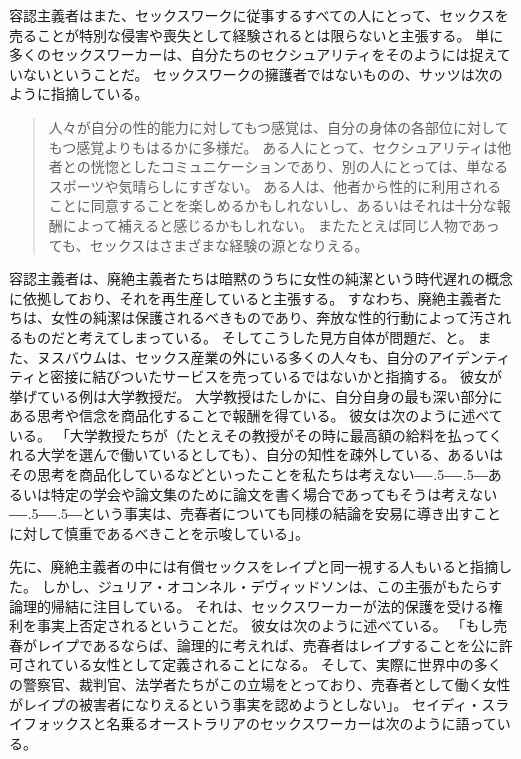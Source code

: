 \documentclass[paper=a4,book,openany]{jlreq}
\def\DDASH{―\kern-.5\zw―\kern-.5\zw―}
\begin{document}
容認主義者はまた、セックスワークに従事するすべての人にとって、セックスを売ることが特別な侵害や喪失として経験されるとは限らないと主張する。
単に多くのセックスワーカーは、自分たちのセクシュアリティをそのようには捉えていないということだ。
セックスワークの擁護者ではないものの、サッツは次のように指摘している。

\begin{quote}
人々が自分の性的能力に対してもつ感覚は、自分の身体の各部位に対してもつ感覚よりもはるかに多様だ。
ある人にとって、セクシュアリティは他者との恍惚としたコミュニケーションであり、別の人にとっては、単なるスポーツや気晴らしにすぎない。
ある人は、他者から性的に利用されることに同意することを楽しめるかもしれないし、あるいはそれは十分な報酬によって補えると感じるかもしれない。
またたとえば同じ人物であっても、セックスはさまざまな経験の源となりえる。
\citep[p.71]{satz95:_market_women_sexual_labor}
\end{quote}

容認主義者は、廃絶主義者たちは暗黙のうちに女性の純潔という時代遅れの概念に依拠しており、それを再生産していると主張する。
すなわち、廃絶主義者たちは、女性の純潔は保護されるべきものであり、奔放な性的行動によって汚されるものだと考えてしまっている。
そしてこうした見方自体が問題だ、と。
また、ヌスバウムは、セックス産業の外にいる多くの人々も、自分のアイデンティティと密接に結びついたサービスを売っているではないかと指摘する。
彼女が挙げている例は大学教授だ。
大学教授はたしかに、自分自身の最も深い部分にある思考や信念を商品化することで報酬を得ている。
彼女は次のように述べている。
「大学教授たちが（たとえその教授がその時に最高額の給料を払ってくれる大学を選んで働いているとしても）、自分の知性を疎外している、あるいはその思考を商品化しているなどといったことを私たちは考えない{\DDASH}あるいは特定の学会や論文集のために論文を書く場合であってもそうは考えない{\DDASH}という事実は、売春者についても同様の結論を安易に導き出すことに対して慎重であるべきことを示唆している」\citep[p.704]{nussbaum98:_wheth_reason_prejud}。

先に、廃絶主義者の中には有償セックスをレイプと同一視する人もいると指摘した。
しかし、ジュリア・オコンネル・デヴィッドソンは、この主張がもたらす論理的帰結に注目している。
それは、セックスワーカーが法的保護を受ける権利を事実上否定されるということだ。
彼女は次のように述べている。
「もし売春がレイプであるならば、論理的に考えれば、売春者はレイプすることを公に許可されている女性として定義されることになる。
そして、実際に世界中の多くの警察官、裁判官、法学者たちがこの立場をとっており、売春者として働く女性がレイプの被害者になりえるという事実を認めようとしない」\citep[p.122]{davidson98:_prost_power_freed}。
セイディ・スライフォックスと名乗るオーストラリアのセックスワーカーは次のように語っている。
\end{document}
